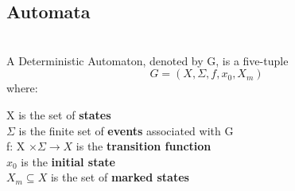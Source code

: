 \subsection{Automata}
\label{sec:automata}
\begin{definition}
\label{def:DeterministicAutomaton}~\\  
A Deterministic Automaton, denoted by G, is a five-tuple
\[ G = (X,\Sigma,f, x_0,X_m)\]
where:

\indent X is the set of \textbf{states} \\
\indent $\Sigma$ is the finite set of \textbf{events} associated with G\\
\indent f: X $\times \Sigma \rightarrow X$ is the \textbf{transition function}  \\ 
\indent $x_0$ is the \textbf{initial state} \\
\indent $X_m \subseteq X $ is the set of \textbf{marked states}

\end{definition}
